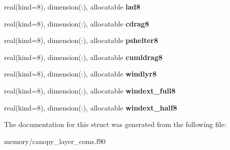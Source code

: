 \begin{DoxyCompactItemize}
\item 
\hypertarget{structcanopy__layer__coms_1_1canstrtype_adcd95b883ed0c616cb9d4731361e6cba}{
real(kind=8), dimension(:), allocatable {\bfseries lad8}}
\label{structcanopy__layer__coms_1_1canstrtype_adcd95b883ed0c616cb9d4731361e6cba}

\item 
\hypertarget{structcanopy__layer__coms_1_1canstrtype_a439412f31d35b01e0782d547adcda250}{
real(kind=8), dimension(:), allocatable {\bfseries cdrag8}}
\label{structcanopy__layer__coms_1_1canstrtype_a439412f31d35b01e0782d547adcda250}

\item 
\hypertarget{structcanopy__layer__coms_1_1canstrtype_abc9d713378fcbb3bcd518e3fd322ab34}{
real(kind=8), dimension(:), allocatable {\bfseries pshelter8}}
\label{structcanopy__layer__coms_1_1canstrtype_abc9d713378fcbb3bcd518e3fd322ab34}

\item 
\hypertarget{structcanopy__layer__coms_1_1canstrtype_aed182c3485aae66f3b2d468d6b341ccf}{
real(kind=8), dimension(:), allocatable {\bfseries cumldrag8}}
\label{structcanopy__layer__coms_1_1canstrtype_aed182c3485aae66f3b2d468d6b341ccf}

\item 
\hypertarget{structcanopy__layer__coms_1_1canstrtype_a0736c5241dd85c30395d0de320db57b2}{
real(kind=8), dimension(:), allocatable {\bfseries windlyr8}}
\label{structcanopy__layer__coms_1_1canstrtype_a0736c5241dd85c30395d0de320db57b2}

\item 
\hypertarget{structcanopy__layer__coms_1_1canstrtype_adfe83a82883d570422a0b85470338150}{
real(kind=8), dimension(:), allocatable {\bfseries windext\_\-full8}}
\label{structcanopy__layer__coms_1_1canstrtype_adfe83a82883d570422a0b85470338150}

\item 
\hypertarget{structcanopy__layer__coms_1_1canstrtype_a7efcd9b09e3e4da23bf77ee2fdc41016}{
real(kind=8), dimension(:), allocatable {\bfseries windext\_\-half8}}
\label{structcanopy__layer__coms_1_1canstrtype_a7efcd9b09e3e4da23bf77ee2fdc41016}

\end{DoxyCompactItemize}


The documentation for this struct was generated from the following file:\begin{DoxyCompactItemize}
\item 
memory/canopy\_\-layer\_\-coms.f90\end{DoxyCompactItemize}
